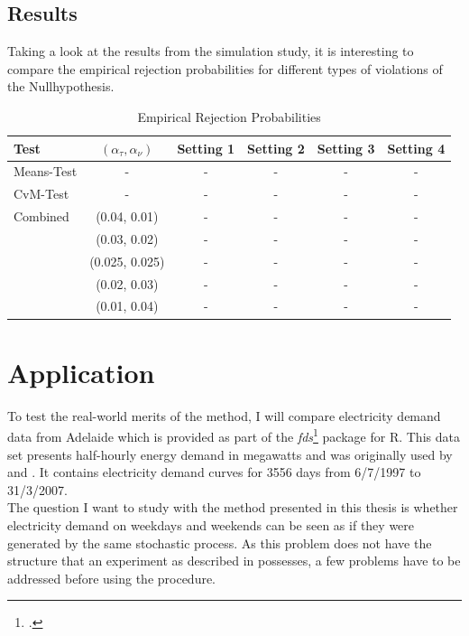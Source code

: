 \documentclass[12pt, a4paper]{article}
\theoremstyle{MAstyle} \newtheorem{assumption}{Assumption}[section]
\theoremstyle{MAstyle} \newtheorem{definition}{Definition}[section]
\theoremstyle{MAstyle} \newtheorem{theorem}{Theorem}[section]
\begin{document}
		\subsection{Results}
		Taking a look at the results from the simulation study, it is interesting to compare the empirical rejection probabilities for different types of violations of the Nullhypothesis.
		
		\begin{table}[h!]
			\centering
			\begin{tabular}{lccccc}\toprule
				\textbf{Test}	&$\left(\alpha_{\tau}, \alpha_{\nu}\right) $ &\textbf{Setting 1} &\textbf{Setting 2}	&\textbf{Setting 3} &\textbf{Setting 4}\\
				\midrule
				Means-Test		& -	& -	& -  & - & - \\
				CvM-Test 		& -	& -	& -  & - & - \\
				\midrule
				Combined		& (0.04, 0.01)		& -	& -  & - & - \\
								& (0.03, 0.02)	& -	& -  & - & - \\
								& (0.025, 0.025)		& -	& -  & - & - \\
								& (0.02, 0.03)	& -	& -  & - & - \\
								& (0.01, 0.04)	& -	& -  & - & - \\
				\bottomrule
			\end{tabular}
			\caption{Empirical Rejection Probabilities}
		\end{table}
		
	\section{Application}\label{Application}
		To test the real-world merits of the method, I will compare electricity demand data from Adelaide which is provided as part of the \textit{fds}\footcite{fds} package for R. This data set presents half-hourly energy demand in megawatts and was originally used by \cite{magnano_generation_2007} and \cite{magnano_generation_2008}. It contains electricity demand curves for 3556 days from 6/7/1997 to 31/3/2007. \\
		The question I want to study with the method presented in this thesis is whether electricity demand on weekdays and weekends can be seen as if they were generated by the same stochastic process. As this problem does not have the structure that an experiment as described in \cite{bugni_permutation_2021} possesses, a few problems have to be addressed before using the procedure.
	
\end{document}
